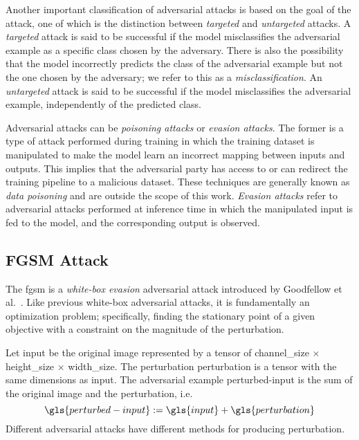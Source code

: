 Another important classification of adversarial attacks is based on the goal of the attack, one of which is the distinction between \emph{targeted} and \emph{untargeted} attacks.
A \emph{targeted} attack is said to be successful if the model misclassifies the adversarial example as a specific class chosen by the adversary. There is also the possibility that the model incorrectly predicts the class of the adversarial example but not the one chosen by the adversary; we refer to this as a \emph{misclassification}.
An \emph{untargeted} attack is said to be successful if the model misclassifies the adversarial example, independently of the predicted class.

Adversarial attacks can be \emph{poisoning attacks} or \emph{evasion attacks}.
The former is a type of attack performed during training in which the training dataset is manipulated to make the model learn an incorrect mapping between inputs and outputs. This implies that the adversarial party has access to or can redirect the training pipeline to a malicious dataset. These techniques are generally known as \emph{data poisoning} and are outside the scope of this work.
\emph{Evasion attacks} refer to adversarial attacks performed at inference time in which the manipulated input is fed to the model, and the corresponding output is observed.

\subsection{FGSM Attack}
\label{subsec:fgsm-attack}

The \acrfull{fgsm} is a \emph{white-box evasion} adversarial attack introduced by Goodfellow et al.~\cite{ExplainingAndGoodfe2014}. Like previous white-box adversarial attacks, it is fundamentally an optimization problem; specifically, finding the stationary point of a given objective with a constraint on the magnitude of the perturbation.

Let \gls{input} be the original image represented by a tensor of \gls{channel_size} $\times$ \gls{height_size} $\times$ \gls{width_size}.
The perturbation \gls{perturbation} is a tensor with the same dimensions as \gls{input}. The adversarial example \gls{perturbed-input} is the sum of the original image and the perturbation, i.e.
\begin{equation}
  \gls{perturbed-input} := \gls{input} + \gls{perturbation}
  \label{eq:perturbed-input}
\end{equation}
Different adversarial attacks have different methods for producing \gls{perturbation}.


